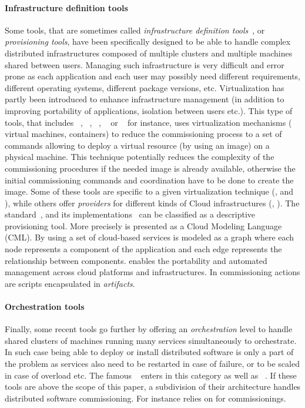 \paragraph{Infrastructure definition tools}
Some tools, that are sometimes called \emph{infrastructure definition
  tools}~\cite{}, or \emph{provisioning tools}, have been specifically
designed to be able to handle complex distributed infrastructures
composed of multiple clusters and multiple machines shared between
users. Managing such infrastructure is very difficult and error prone
as each application and each user may possibly need different
requirements, different operating systems, different package versions,
etc. Virtualization has partly been introduced to enhance
infrastructure management (in addition to improving portability of
applications, isolation between users etc.). This type of tools, that
includes \docker~\cite{docker:web}, \terraform~\cite{terraform:web},
\juju~\cite{juju:web}, \cloudformation~\cite{cloudf:web} or
\heat~\cite{heat:web} for instance, uses virtualization mechanisms (\eg
virtual machines, containers) to reduce the commissioning process to a
set of commands allowing to deploy a virtual resource (by using an image) on a
physical machine. This technique potentially reduces the complexity of
the commissioning procedures if the needed image is already available,
otherwise the initial commissioning commands and coordination have to
be done to create the image. Some of these tools are specific to a
given virtualization technique (\eg \docker, \cloudformation and
\heat), while others offer \emph{providers} for different kinds of
Cloud infrastructures (\eg \terraform, \juju). The \tosca
standard~\cite{tosca:web}, and its
implementations~\cite{Binz2013,cloudify:web,opentosca:web,8599581} can
be classified as a descriptive provisioning tool. More precisely
\tosca is presented as a Cloud Modeling Language (CML). By using
\tosca a set of cloud-based services is modeled as a graph where each
node represents a component of the application and each edge
represents the relationship between components. \tosca enables the
portability and automated management across cloud platforms and
infrastructures. In \tosca commissioning actions are scripts
encapsulated in \emph{artifacts}.

\paragraph{Orchestration tools}
Finally, some recent tools go further by offering an
\emph{orchestration} level to handle shared clusters of machines
running many services simultaneously to orchestrate. In such case
being able to deploy or install distributed software is only a part of
the problem as services also need to be restarted in case of failure, or
to be scaled in case of overload etc. The famous
\kubernetes~\cite{kubernetes:web} enters in this category as well as
\dockerswarm~\cite{dockerswarm:web}. If these tools are above the
scope of this paper, a subdivision of their architecture handles
distributed software commissioning. For instance \kubernetes relies
on \docker for commissionings.

